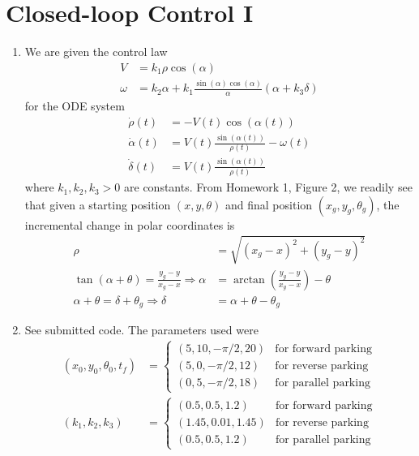 \documentclass[12pt]{article}
\begin{document}
\section{Closed-loop Control I}
\begin{enumerate}
	\item We are given the control law
	\begin{align*}
		V &= k_1\rho\cos(\alpha) \\
		\omega &= k_2\alpha + k_1\frac{\sin(\alpha)\cos(\alpha)}{\alpha}(\alpha + k_3\delta)
	\end{align*}
	for the ODE system
	\begin{align*}
		\dot \rho(t) &= -V(t)\cos(\alpha(t)) \\
		\dot \alpha(t) &= V(t)\frac{\sin(\alpha(t))}{\rho(t)} - \omega(t) \\
		\dot \delta(t) &= V(t)\frac{\sin(\alpha(t))}{\rho(t)}
	\end{align*}
	where $k_1,k_2,k_3 > 0$ are constants. From Homework 1, Figure 2, we readily see that given a starting position $(x,y,\theta)$ and final position $(x_g,y_g,\theta_g)$, the incremental change in polar coordinates is
	\begin{align*}
		\rho &= \sqrt{(x_g - x)^2 + (y_g - y)^2} \\
		\tan(\alpha + \theta) = \frac{y_g - y}{x_g - x} \Rightarrow \alpha &= \arctan{\left(\frac{y_g - y}{x_g - x}\right)} - \theta \\
		\alpha + \theta = \delta + \theta_g \Rightarrow \delta &= \alpha + \theta - \theta_g
	\end{align*}
	\item See submitted code. The parameters used were
	\begin{align*}
		(x_0,y_0,\theta_0,t_f) &=
		\begin{cases}
			(5,10,-\pi/2,20) & \mbox{for forward parking} \\
			(5,0,-\pi/2,12) & \mbox{for reverse parking} \\
			(0,5,-\pi/2,18) & \mbox{for parallel parking}
		\end{cases} \\
		(k_1,k_2,k_3) &=
		\begin{cases}
			(0.5,0.5,1.2) & \mbox{for forward parking} \\
			(1.45,0.01,1.45) & \mbox{for reverse parking} \\
			(0.5,0.5,1.2) & \mbox{for parallel parking}
		\end{cases}
	\end{align*}

\end{enumerate}
\end{document}
